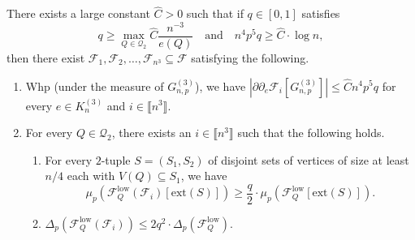 \documentclass[11pt,a4paper,oneside,reqno]{amsart}
\newcommand{\Gnp}{G_{n, p}^{(3)}}
\newcommand{\cF}{\mathcal{F}}
\newcommand{\cQ}{\mathcal{Q}}
\newcommand{\1}{\mathbbm{1}} %
\newcommand{\br}[1]{\llbracket{#1}\rrbracket}
\renewcommand{\le}{\leqslant}
\renewcommand{\ge}{\geqslant}
\newcommand{\cFQL}{\cF_Q^{\mathrm{low}}}
\newcommand{\ext}{\mathrm{ext}}
\begin{document}
\begin{lemma}\label{lemma:sparsification}
    There exists a large constant $\hat{C} > 0$ such that if $q \in [0, 1]$ satisfies
    \[
        q \ge \max_{Q \in \cQ_2} \hat{C} \frac{n^{-3}}{e(Q)}\quad \text{and} \quad n^4 p^5 q \ge \hat{C} \cdot \log n,
    \]
    then there exist $\cF_1, \cF_2, \dots, \cF_{n^3} \subseteq \cF$ satisfying the following.
    \begin{enumerate}
        \item Whp (under the measure of $\Gnp$), we have $\left| \partial \partial_e\cF_i\left[\Gnp\right] \right| \le \hat{C} n^4 p^5 q$ for every $e \in K_n^{(3)}$ and $i \in \br{n^3}$.   
        \item For every $Q \in \cQ_2$, there exists an $i \in \br{n^3}$ such that the following holds.
        \begin{enumerate}
            \item For every $2$-tuple $S = (S_1, S_2)$ of disjoint sets of vertices of size at least $n/4$ each with $V(Q) \subseteq S_1$, we have 
            \[
                \mu_p\left(\cFQL(\cF_i)[\ext(S)]\right) \ge \frac{q}{2} \cdot \mu_p\left(\cFQL[\ext(S)]\right).
            \]
            \item $\Delta_p\left(\cFQL(\cF_i)\right) \le 2 q^2 \cdot \Delta_p\left(\cFQL\right)$.
        \end{enumerate}
    \end{enumerate}
\end{lemma}
\end{document}
